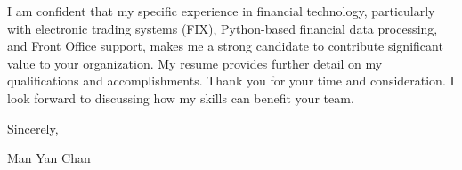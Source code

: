 \documentclass[11pt, a4paper]{article} %
\begin{document}
I am confident that my specific experience in financial technology, particularly with electronic trading systems (FIX), Python-based financial data processing, and Front Office support, makes me a strong candidate to contribute significant value to your organization. My resume provides further detail on my qualifications and accomplishments. Thank you for your time and consideration. I look forward to discussing how my skills can benefit your team.

\medskip %
Sincerely,

\vspace{1\baselineskip} %

Man Yan Chan %

\end{document}
